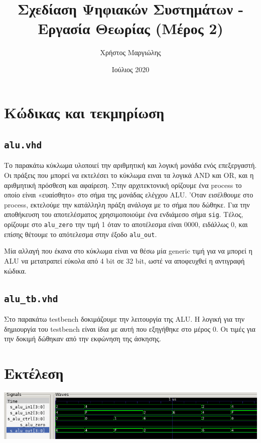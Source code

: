 \documentclass{article}
\title{Σχεδίαση Ψηφιακών Συστημάτων - Εργασία Θεωρίας (Μέρος 2)}
\author{Χρήστος Μαργιώλης}
\date{Ιούλιος 2020}
\begin{document}
\begin{titlepage}
        \maketitle
\end{titlepage}

\renewcommand{\contentsname}{Περιεχόμενα}
\tableofcontents

\section{Κώδικας και τεκμηρίωση}

\subsection{\lstinline{alu.vhd}}

Το παρακάτω κύκλωμα υλοποιεί την αριθμητική και λογική μονάδα ενός επεξεργαστή.
Οι πράξεις που μπορεί να εκτελέσει το κύκλωμα ειναι τα λογικά AND και OR, και η
αριθμητική πρόσθεση και αφαίρεση. Στην αρχιτεκτονική ορίζουμε ένα process το
οποίο είναι «ευαίσθητο» στο σήμα της μονάδας ελέγχου ALU. 'Οταν εισέλθουμε
στο process, εκτελούμε την κατάλληλη πράξη ανάλογα με το σήμα που δώθηκε. Για
την αποθήκευση του αποτελέσματος χρησιμοποιούμε ένα ενδιάμεσο σήμα \lstinline{sig}.
Τέλος, ορίζουμε στο \lstinline{alu_zero} την τιμή 1 όταν το αποτέλεσμα είναι
0000, ειδάλλως 0, και επίσης θέτουμε το απότελεσμα στην έξοδο \lstinline{alu_out}.

Μία αλλαγή που έκανα στο κύκλωμα είναι να θέσω μία generic τιμή για να μπορεί
η ALU να μετατραπεί εύκολα από 4 bit σε 32 bit, ωστέ να αποφευχθεί η αντιγραφή
κώδικα.


\pagebreak

\subsection{\lstinline{alu_tb.vhd}}

Στο παρακάτω testbench δοκιμάζουμε την λειτουργία της ALU. Η λογική για την
δημιουργία του testbench είναι ίδια με αυτή που εξηγήθηκε στο μέρος 0. Οι τιμές
για την δοκιμή δώθηκαν από την εκφώνηση της άσκησης.


\pagebreak

\section{Εκτέλεση}

\includegraphics[width=\textwidth]{res/alu.png}
\end{document}
